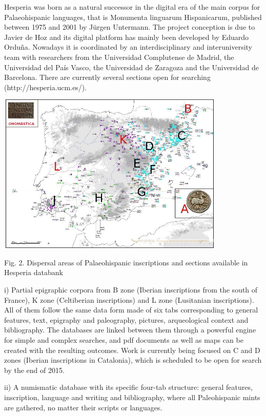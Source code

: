 \documentclass[amsthm,ebook]{saparticle}
\begin{document}
Hesperia was born as a natural successor in the digital era of the main corpus for Palaeohispanic languages, that is
Monumenta linguarum Hispanicarum, published between 1975 and 2001 by Jürgen Untermann. The project conception is due to
Javier de Hoz and its digital platform has mainly been developed by Eduardo Orduña. Nowadays it is coordinated by an
interdisciplinary and interuniversity team with researchers from the Universidad Complutense de Madrid, the Universidad
del País Vasco, the Universidad de Zaragoza and the Universidad de Barcelona. There are currently several sections open
for searching (http://hesperia.ucm.es/).

 \includegraphics[width=10.896cm,height=7.669cm]{EpigraphyandonomasticsinHesperiadatabanktemplate-img002.png} 

Fig. 2. Dispersal areas of Palaeohispanic inscriptions and sections available in Hesperia databank

i) Partial epigraphic corpora from B zone (Iberian inscriptions from the south of France), K zone (Celtiberian
inscriptions) and L zone (Lusitanian inscriptions). All of them follow the same data form made of six tabs
corresponding to {\textquotedbl}general features{\textquotedbl}, {\textquotedbl}text{\textquotedbl},
{\textquotedbl}epigraphy and paleography{\textquotedbl}, {\textquotedbl}pictures{\textquotedbl},
{\textquotedbl}arqueological context{\textquotedbl} and {\textquotedbl}bibliography{\textquotedbl}. The databases are
linked between them through a powerful engine for simple and complex searches, and pdf documents as well as maps can be
created with the resulting outcomes. Work is currently being focused on C and D zones (Iberian inscriptions in
Catalonia), which is scheduled to be open for search by the end of 2015.

ii) A numismatic database with its specific four-tab structure: {\textquotedbl}general features{\textquotedbl},
{\textquotedbl}inscription{\textquotedbl}, {\textquotedbl}language and writing{\textquotedbl} and
{\textquotedbl}bibliography{\textquotedbl}, where all Paleohispanic mints are gathered, no matter their scripts or
languages.
\end{document}
